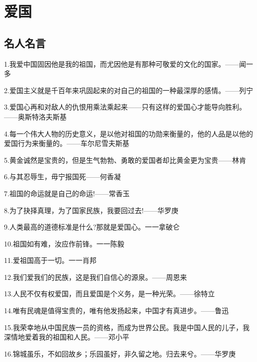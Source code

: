 \documentclass[UTF8]{ctexart}
\begin{document}
\section{爱国}
\subsection{名人名言}
1.我爱中国固因他是我的祖国，而尤因他是有那种可敬爱的文化的国家。——闻一多\par
2.爱国主义就是千百年来巩固起来的对自己的祖国的一种最深厚的感情。——列宁\par
3.爱国心再和对敌人的仇恨用乘法乘起来——只有这样的爱国心才能导向胜利。——奥斯特洛夫斯基\par
4.每一个伟大人物的历史意义，是以他对祖国的功勋来衡量的，他的人品是以他的爱国行为来衡量的。——车尔尼雪夫斯基\par
5.黄金诚然是宝贵的，但是生气勃勃、勇敢的爱国者却比黄金更为宝贵——林肯\par
6.与其忍辱生，毋宁报国死——何香凝\par
7.祖国的命运就是自己的命运!——常香玉\par
8.为了抉择真理，为了国家民族，我要回过去!——华罗庚\par
9.人类最高的道德标准是什么?那就是爱国心。一一拿破仑\par
10.祖国如有难，汝应作前锋。一一陈毅\par
11.爱祖国高于一切。一一肖邦\par
12.我们爱我们的民族，这是我们自信心的源泉。——周恩来\par
13.人民不仅有权爱国，而且爱国是个义务，是一种光荣。——徐特立\par
14.唯有民魂是值得宝贵的，唯有他发扬起来，中国才有真进步。——鲁迅\par
15.我荣幸地从中国民族一员的资格，而成为世界公民。我是中国人民的儿子，我深情地爱着我的祖国和人民。——邓小平\par
16.锦城虽乐，不如回故乡；乐园虽好，非久留之地。归去来兮。——华罗庚\par\par
\end{document}
